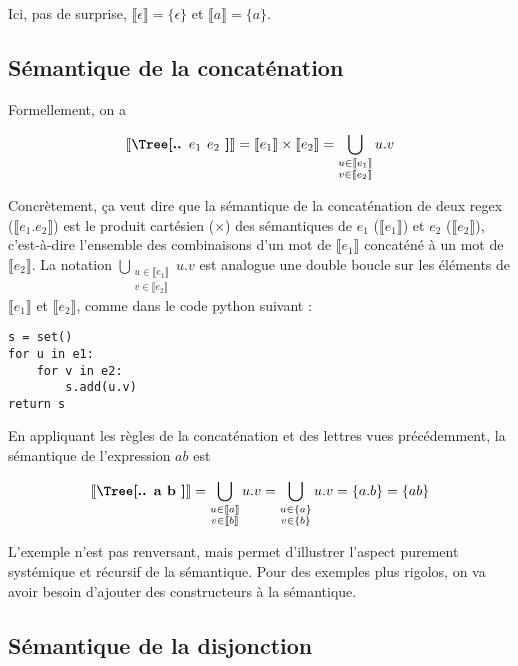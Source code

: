 Ici, pas de surprise, $\llbracket \epsilon \rrbracket = \{\epsilon\}$ et $\llbracket a \rrbracket = \{a\}$. 

\subsection{Sémantique de la concaténation}

Formellement, on a 

\[\mt{\Tree[.{.} $e_1$ $e_2$ ]} = \llbracket e_1 \rrbracket \times \llbracket e_2 \rrbracket = \bigcup_{\substack{u \in \llbracket e_1 \rrbracket \\ v \in \llbracket e_2 \rrbracket}} u.v \]

Concrètement, ça veut dire que la sémantique de la concaténation de deux regex ($\llbracket e_1.e_2 \rrbracket$) est le produit cartésien ($\times$) des sémantiques de $e_1$ ($\llbracket e_1 \rrbracket$) et $e_2$ ($\llbracket e_2 \rrbracket$), c'est-à-dire l'ensemble des combinaisons d'un mot de $\llbracket e_1 \rrbracket$ concaténé à un mot de $\llbracket e_2 \rrbracket$. La notation $\bigcup_{\substack{u \in \llbracket e_1 \rrbracket \\ v \in \llbracket e_2 \rrbracket}} u.v$ est analogue une double boucle sur les éléments de $\llbracket e_1 \rrbracket$ et $\llbracket e_2 \rrbracket$, comme dans le code python suivant :

\begin{verbatim}
s = set()
for u in e1:
    for v in e2:
        s.add(u.v)
return s
\end{verbatim}


\begin{example}
En appliquant les règles de la concaténation et des lettres vues précédemment, la sémantique de l'expression $ab$ est 

\[\mt{\Tree[.{.} a b ]} = \bigcup_{\substack{u \in \llbracket a \rrbracket \\ v \in \llbracket b \rrbracket}} u.v = \bigcup_{\substack{u \in \{a\} \\ v \in \{b\}}} u.v = \{a.b\} = \{ab\}\]
\end{example}

L'exemple n'est pas renversant, mais permet d'illustrer l'aspect purement systémique et récursif de la sémantique. Pour des exemples plus rigolos, on va avoir besoin d'ajouter des constructeurs à la sémantique.

\subsection{Sémantique de la disjonction}

